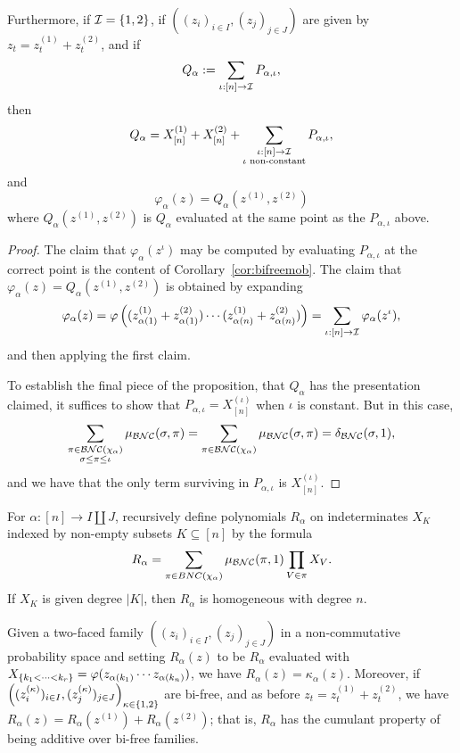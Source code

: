 \begin{proposition}
	Furthermore, if $\mathcal{I} = \left\{1,2\right\}$, if $((z_i)_{i\in I}, (z_j)_{j\in J})$ are given by $z_t = z_t^{(1)} + z_t^{(2)}$, and if
	$$Q_\alpha := \sum_{\iota : [n] \to \mathcal{I}} P_{\alpha, \iota},$$
	then
	$$Q_\alpha = X^{(1)}_{[n]} + X^{(2)}_{[n]} + \sum_{\substack{\iota : [n] \to \mathcal{I} \\ \iota \text{ non-constant}}} P_{\alpha, \iota},$$
	and
	$$\varphi_\alpha(z) = Q_\alpha(z^{(1)}, z^{(2)})$$
	where $Q_\alpha(z^{(1)},z^{(2)})$ is $Q_\alpha$ evaluated at the same point as the $P_{\alpha,\iota}$ above.
\end{proposition}

\begin{proof}
	The claim that $\varphi_\alpha(z^\iota)$ may be computed by evaluating $P_{\alpha, \iota}$ at the correct point is the content of Corollary~\ref{cor:bifreemob}.
	The claim that $\varphi_\alpha(z) = Q_\alpha(z^{(1)}, z^{(2)})$ is obtained by expanding
	$$\varphi_\alpha(z) = \varphi\left((z_{\alpha(1)}^{(1)} + z_{\alpha(1)}^{(2)})\cdots (z_{\alpha(n)}^{(1)}+z_{\alpha(n)}^{(2)})\right)
	= \sum_{\iota : [n] \to \mathcal{I}} \varphi_{\alpha}(z^\iota),$$
	and then applying the first claim.

	To establish the final piece of the proposition, that $Q_\alpha$ has the presentation claimed, it suffices to show that $P_{\alpha, \iota} = X_{[n]}^{(\iota)}$ when $\iota$ is constant.
	But in this case,
	$$\sum_{\substack{\pi\in\mathcal{BNC}(\chi_\alpha) \\ \sigma \leq \pi \leq \iota}} \mu_{\mathcal{BNC}}(\sigma, \pi)
	= \sum_{\pi \in \mathcal{BNC}(\chi_\alpha)} \mu_{\mathcal{BNC}}(\sigma, \pi) = \delta_{\mathcal{BNC}}(\sigma, 1),$$
	and we have that the only term surviving in $P_{\alpha, \iota}$ is $X_{[n]}^{(\iota)}$.
\end{proof}

\begin{proposition}
	For $\alpha : [n] \to I \coprod J$, recursively define polynomials $R_\alpha$ on indeterminates $X_K$ indexed by non-empty subsets $K\subseteq [n]$ by the formula
	$$
	R_\alpha = \sum_{\pi\in BNC(\chi_\alpha)} \mu_{\mathcal{BNC}}(\pi, 1) \prod_{V \in \pi} X_V.
	$$
	If $X_K$ is given degree $|K|$, then $R_\alpha$ is homogeneous with degree $n$.

	Given a two-faced family $((z_i)_{i\in I}, (z_j)_{j\in J})$ in a non-commutative probability space and setting $R_\alpha(z)$ to be $R_\alpha$ evaluated with $X_{\left\{k_1<\cdots<k_r\right\}} = \varphi(z_{\alpha(k_1)}\cdots z_{\alpha(k_n)})$, we have $R_\alpha(z) = \kappa_\alpha(z)$.
	Moreover, if $\left((z^{(\kappa)}_i)_{i\in I}, (z^{(\kappa)}_j)_{j\in J}\right)_{\kappa\in\left\{1,2\right\}}$ are bi-free, and as before $z_t = z_t^{(1)}+z_t^{(2)}$, we have $R_\alpha(z) = R_\alpha(z^{(1)}) + R_\alpha(z^{(2)})$; that is, $R_\alpha$ has the cumulant property of being additive over bi-free families.
\end{proposition}

